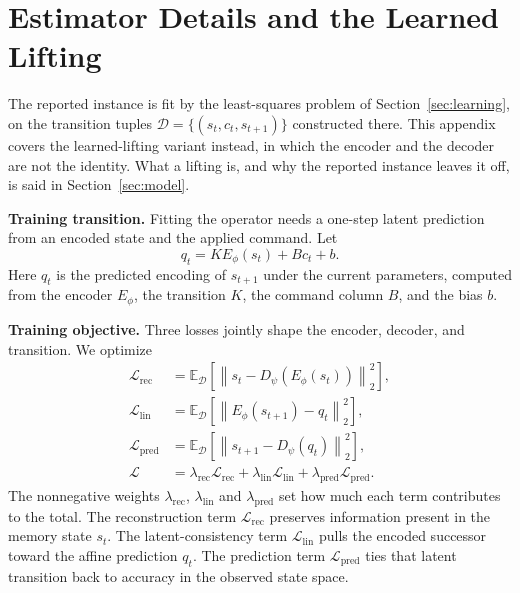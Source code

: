 \section{Estimator Details and the Learned Lifting}
\label{app:A1_estimator}

The reported instance is fit by the least-squares problem of
Section~\ref{sec:learning}, on the transition tuples
$\mathcal{D}=\{(s_t,c_t,s_{t+1})\}$ constructed there. This appendix covers
the learned-lifting variant instead, in which the encoder and the decoder are
not the identity. What a lifting is, and why the reported instance leaves it
off, is said in Section~\ref{sec:model}.

\textbf{Training transition.} Fitting the operator needs a one-step
latent prediction from an encoded state and the applied command. Let
\begin{equation}
    q_t
    =
    K E_{\phi}(s_t)+B c_t+b.
    \label{eq:training_transition}
\end{equation}
Here $q_t$ is the predicted encoding of $s_{t+1}$ under the current
parameters, computed from the encoder $E_{\phi}$, the transition $K$,
the command column $B$, and the bias $b$.

\textbf{Training objective.} Three losses jointly shape the encoder,
decoder, and transition. We optimize
\begin{equation}
    \begin{aligned}
        \mathcal{L}_{\mathrm{rec}}
        &=
        \mathbb{E}_{\mathcal{D}}\!\left[
            \left\|
                s_t-D_{\psi}(E_{\phi}(s_t))
            \right\|_2^2
        \right],\\
        \mathcal{L}_{\mathrm{lin}}
        &=
        \mathbb{E}_{\mathcal{D}}\!\left[
            \left\|
                E_{\phi}(s_{t+1})-q_t
            \right\|_2^2
        \right],\\
        \mathcal{L}_{\mathrm{pred}}
        &=
        \mathbb{E}_{\mathcal{D}}\!\left[
            \left\|
                s_{t+1}-D_{\psi}(q_t)
            \right\|_2^2
        \right],\\
        \mathcal{L}
        &=
        \lambda_{\mathrm{rec}}\mathcal{L}_{\mathrm{rec}}
        +
        \lambda_{\mathrm{lin}}\mathcal{L}_{\mathrm{lin}}
        +
        \lambda_{\mathrm{pred}}\mathcal{L}_{\mathrm{pred}}.
    \end{aligned}
    \label{eq:training_objective}
\end{equation}
The nonnegative weights $\lambda_{\mathrm{rec}}$,
$\lambda_{\mathrm{lin}}$ and $\lambda_{\mathrm{pred}}$ set how much
each term contributes to the total.
The reconstruction term $\mathcal{L}_{\mathrm{rec}}$ preserves
information present in the memory state $s_t$. The latent-consistency
term $\mathcal{L}_{\mathrm{lin}}$ pulls the encoded successor toward the
affine prediction $q_t$. The prediction term $\mathcal{L}_{\mathrm{pred}}$
ties that latent transition back to accuracy in the observed state
space.


